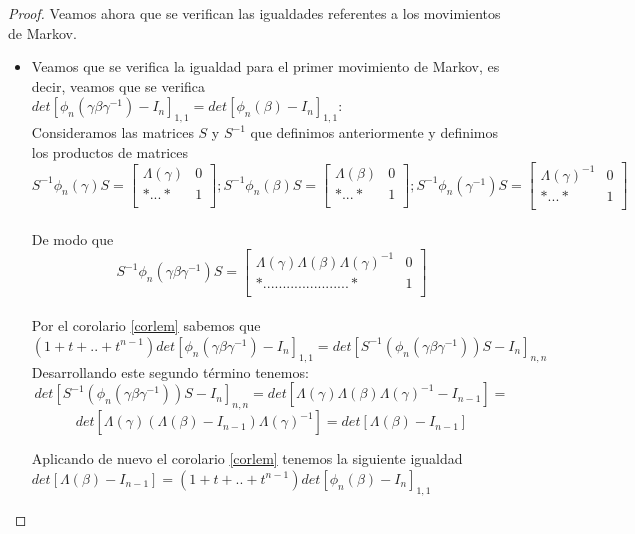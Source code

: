 \begin{proof}
 	 Veamos ahora que se verifican las igualdades referentes a los movimientos de Markov.
 	 \begin{itemize}
 	 	\item 
 	 Veamos que se verifica la igualdad para el primer movimiento de Markov, es decir, veamos que se verifica $ det[\phi_{n}(\gamma\beta\gamma^{-1}) - I_{n}]_{1,1} = det[\phi_{n}(\beta) - I_{n}]_{1,1}$:\\
 	 Consideramos las matrices $ S $ y $ S^{-1} $ que definimos anteriormente y definimos los productos de matrices     
 	 \[S^{-1}\phi_{n}(\gamma)S = \left[\begin{array}{r|r}
 	 \Lambda (\gamma) & 0 \\ \hline	
 	 * ... * & 1\\
 	 \end{array}\right];
 	 S^{-1}\phi_{n}(\beta)S = \left[\begin{array}{r|r}
 	 \Lambda (\beta) & 0 \\ \hline	
 	 * ... * & 1\\
 	 \end{array}\right];
 	 S^{-1}\phi_{n}(\gamma^{-1})S = \left[\begin{array}{r|r}
 	 \Lambda (\gamma)^{-1} & 0 \\ \hline	
 	 * ... * & 1\\
 	 \end{array}\right]\]\\
 	 
 	 De modo que  	 
 	 \[ S^{-1}\phi_{n}(\gamma\beta\gamma^{-1})S = \left[\begin{array}{r|r}
 	 \Lambda (\gamma)\Lambda (\beta)\Lambda (\gamma)^{-1} & 0 \\ \hline	
 	 * ...................... * & 1\\
 	 \end{array}\right]\]\\
	 Por el corolario \ref{corlem} sabemos que \\
	 $ (1+t+..+ t^{n-1} ) det[ \phi_{n}(\gamma\beta\gamma^{-1}) - I_{n}] _{1,1} = det[S^{-1}(\phi_{n}(\gamma\beta\gamma^{-1}))S-I_{n}]_{n,n}$\\
	 
	 Desarrollando este segundo término tenemos:
	 \[det[S^{-1}(\phi_{n}(\gamma\beta\gamma^{-1}))S-I_{n}]_{n,n} = det[\Lambda (\gamma)\Lambda (\beta)\Lambda (\gamma)^{-1}-I_{n-1}] =\]
	 \[
	 det[\Lambda (\gamma)(\Lambda (\beta)-I_{n-1})\Lambda (\gamma)^{-1}] =
	 det[\Lambda (\beta)-I_{n-1}] \]
	 
	 Aplicando de nuevo el corolario \ref{corlem} tenemos la siguiente igualdad\\
	 $det[\Lambda (\beta)-I_{n-1}]  = (1+t+..+ t^{n-1} ) det[ \phi_{n}(\beta) - I_{n}] _{1,1} $\\
	 

\end{itemize}
\end{proof}
